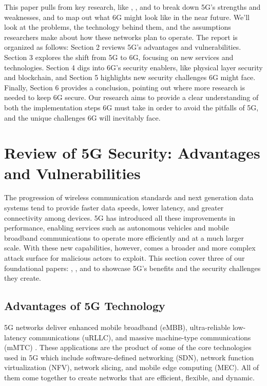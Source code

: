 \documentclass[acmtog]{acmart}
\begin{document}
This paper pulls from key research, like \cite{ref3}, \cite{ref6}, and \cite{ref7} to break down 5G’s strengths and weaknesses, and \cite{ref4} to map out what 6G might look like in the near future. We’ll look at the problems, the technology behind them, and the assumptions researchers make about how these networks plan to operate. The report is organized as follows: Section 2 reviews 5G’s advantages and vulnerabilities. Section 3 explores the shift from 5G to 6G, focusing on new services and technologies. Section 4 digs into 6G’s security enablers, like physical layer security and blockchain, and Section 5 highlights new security challenges 6G might face. Finally, Section 6 provides a conclusion, pointing out where more research is needed to keep 6G secure. Our research aims to provide a clear understanding of both the implementation steps 6G must take in order to avoid the pitfalls of 5G, and the unique challenges 6G will inevitably face. 

\section{Review of 5G Security: Advantages and Vulnerabilities}
The progression of wireless communication standards and next generation data systems tend to provide faster data speeds, lower latency, and greater connectivity among devices. 5G has introduced all these improvements in performance, enabling services such as autonomous vehicles and mobile broadband communications to operate more efficiently and at a much larger scale. With these new capabilities, however, comes a broader and more complex attack surface for malicious actors to exploit. This section cover three of our foundational papers: \cite{ref3}, \cite{ref6}, and \cite{ref7} to showcase 5G's benefits and the security challenges they create.

\subsection{Advantages of 5G Technology}
5G networks deliver enhanced mobile broadband (eMBB), ultra-reliable low-latency communications (uRLLC), and massive machine-type communications (mMTC) \cite{ref6}. These applications are the product of some of the core technologies used in 5G which include software-defined networking (SDN), network function virtualization (NFV), network slicing, and mobile edge computing (MEC). All of them come together to create networks that are efficient, flexible, and dynamic. 
\end{document}
